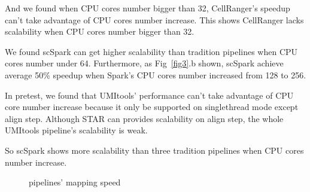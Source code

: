 \documentclass[conference]{IEEEtran}
\begin{document}
And we found when CPU cores number bigger than 32, CellRanger's speedup can't take advantage of CPU cores number increase.
This shows CellRanger lacks scalability when CPU cores number bigger than 32.

We found scSpark can get higher scalability than tradition pipelines when CPU cores number under 64.
Furthermore, as Fig~\ref{fig3}.b shown, scSpark achieve average 50\% speedup when Spark's CPU cores number increased from 128 to 256.

In pretest, we found that UMI\-tools' performance can't take advantage of CPU core number increase because it only be supported on single\-thread mode except align step.
Although STAR can provides scalability on align step, the whole UMI\-tools pipeline's scalability is weak.

So scSpark shows more scalability than three tradition pipelines when CPU cores number increase.

\begin{figure}
	\centering
	\caption{ pipelines' mapping speed }
	\label{fig4}
\end{figure}
\end{document}
